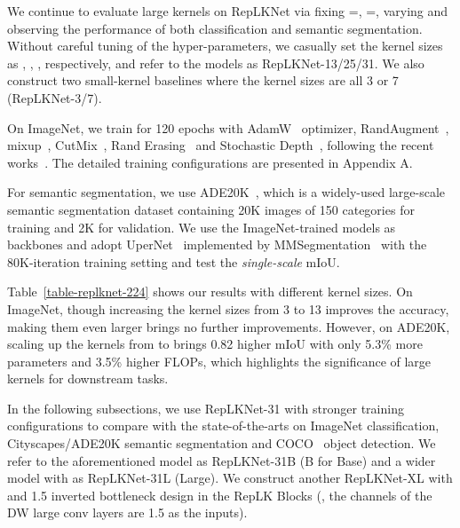 \documentclass[10pt,twocolumn,letterpaper]{article}
\begin{document}
	We continue to evaluate large kernels on RepLKNet via fixing =, =, varying  and observing the performance of both classification and semantic segmentation. Without careful tuning of the hyper-parameters, we casually set the kernel sizes as , , , respectively, and refer to the models as RepLKNet-13/25/31. We also construct two small-kernel baselines where the kernel sizes are all 3 or 7 (RepLKNet-3/7). 
	
	On ImageNet, we train for 120 epochs with AdamW~\cite{loshchilov2017decoupled} optimizer, RandAugment~\cite{cubuk2020randaugment}, mixup~\cite{zhang2017mixup}, CutMix~\cite{yun2019cutmix}, Rand Erasing~\cite{zhong2020random} and Stochastic Depth~\cite{stochastic}, following the recent works~\cite{swin,deit,bao2021beit,liu2022convnet}. The detailed training configurations are presented in Appendix A.
	
	For semantic segmentation, we use ADE20K~\cite{zhou2019semantic}, which is a widely-used large-scale semantic segmentation dataset containing 20K images of 150 categories for training and 2K for validation. We use the ImageNet-trained models as backbones and adopt UperNet~\cite{xiao2018unified} implemented by MMSegmentation~\cite{mmseg2020} with the 80K-iteration training setting and test the \emph{single-scale} mIoU.
	
	Table~\ref{table-replknet-224} shows our results with different kernel sizes. On ImageNet, though increasing the kernel sizes from 3 to 13 improves the accuracy, making them even larger brings no further improvements. However, on ADE20K, scaling up the kernels from  to  brings 0.82 higher mIoU with only 5.3\% more parameters and 3.5\% higher FLOPs, which highlights the significance of large kernels for downstream tasks.
	
	In the following subsections, we use RepLKNet-31 with stronger training configurations to compare with the state-of-the-arts on ImageNet classification, Cityscapes/ADE20K semantic segmentation and COCO~\cite{lin2014microsoft} object detection. We refer to the aforementioned model as RepLKNet-31B (B for Base) and a wider model with  as RepLKNet-31L (Large). We construct another RepLKNet-XL with  and 1.5 inverted bottleneck design in the RepLK Blocks (\ie, the channels of the DW large conv layers are 1.5 as the inputs).
	
\end{document}
